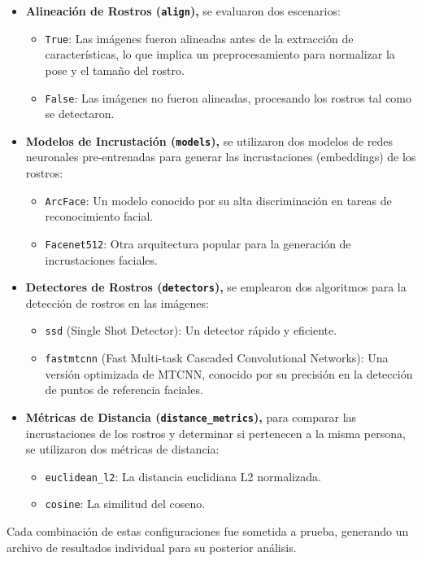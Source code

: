 \begin{itemize}
	\item \textbf{Alineación de Rostros (\texttt{align}),} se evaluaron dos escenarios:
	\begin{itemize}
		\item \texttt{True}: Las imágenes fueron alineadas antes de la extracción de características, lo que implica un preprocesamiento para normalizar la pose y el tamaño del rostro.
		\item \texttt{False}: Las imágenes no fueron alineadas, procesando los rostros tal como se detectaron.
	\end{itemize}
	\item \textbf{Modelos de Incrustación (\texttt{models}),} se utilizaron dos modelos de redes neuronales pre-entrenadas para generar las incrustaciones (embeddings) de los rostros:
	\begin{itemize}
		\item \texttt{ArcFace}: Un modelo conocido por su alta discriminación en tareas de reconocimiento facial.
		\item \texttt{Facenet512}: Otra arquitectura popular para la generación de incrustaciones faciales.
	\end{itemize}
	\item \textbf{Detectores de Rostros (\texttt{detectors}),} se emplearon dos algoritmos para la detección de rostros en las imágenes:
	\begin{itemize}
		\item \texttt{ssd} (Single Shot Detector): Un detector rápido y eficiente.
		\item \texttt{fastmtcnn} (Fast Multi-task Cascaded Convolutional Networks): Una versión optimizada de MTCNN, conocido por su precisión en la detección de puntos de referencia faciales.
	\end{itemize}
	\item \textbf{Métricas de Distancia (\texttt{distance\_metrics}),} para comparar las incrustaciones de los rostros y determinar si pertenecen a la misma persona, se utilizaron dos métricas de distancia:
	\begin{itemize}
		\item \texttt{euclidean\_l2}: La distancia euclidiana L2 normalizada.
		\item \texttt{cosine}: La similitud del coseno.
	\end{itemize}
\end{itemize}

Cada combinación de estas configuraciones fue sometida a prueba, generando un archivo de resultados individual para su posterior análisis.


